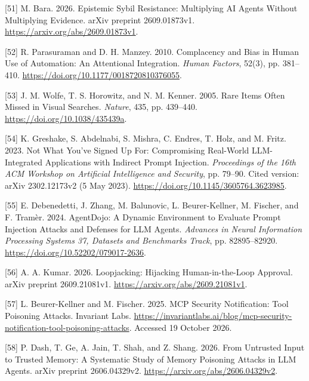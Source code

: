 \documentclass[
  11pt,
]{article}
\newlength{\cslhangindent}
\newlength{\cslentryspacingunit} %
\newenvironment{CSLReferences}[2] %
 {%
  \setlength{\parindent}{0pt}
  \ifodd #1
  \let\oldpar\par
  \def\par{\hangindent=\cslhangindent\oldpar}
  \fi
  \setlength{\parskip}{#2\cslentryspacingunit}
 }%
 {}
\begin{document}
\begin{CSLReferences}{1}{1}
\leavevmode{}%
{[}51{]} M. Bara. 2026. Epistemic Sybil Resistance: Multiplying AI
Agents Without Multiplying Evidence. arXiv preprint 2609.01873v1.
\url{https://arxiv.org/abs/2609.01873v1}.

\leavevmode{}%
{[}52{]} R. Parasuraman and D. H. Manzey. 2010. Complacency and Bias in
Human Use of Automation: An Attentional Integration. \emph{Human
Factors}, 52(3), pp. 381--410.
\url{https://doi.org/10.1177/0018720810376055}.

\leavevmode{}%
{[}53{]} J. M. Wolfe, T. S. Horowitz, and N. M. Kenner. 2005. Rare Items
Often Missed in Visual Searches. \emph{Nature}, 435, pp. 439--440.
\url{https://doi.org/10.1038/435439a}.

\leavevmode{}%
{[}54{]} K. Greshake, S. Abdelnabi, S. Mishra, C. Endres, T. Holz, and
M. Fritz. 2023. Not What You've Signed Up For: Compromising Real-World
LLM-Integrated Applications with Indirect Prompt Injection.
\emph{Proceedings of the 16th ACM Workshop on Artificial Intelligence
and Security}, pp. 79--90. Cited version: arXiv 2302.12173v2 (5 May
2023). \url{https://doi.org/10.1145/3605764.3623985}.

\leavevmode{}%
{[}55{]} E. Debenedetti, J. Zhang, M. Balunovic, L. Beurer-Kellner, M.
Fischer, and F. Tramèr. 2024. AgentDojo: A Dynamic Environment to
Evaluate Prompt Injection Attacks and Defenses for LLM Agents.
\emph{Advances in Neural Information Processing Systems 37, Datasets and
Benchmarks Track}, pp. 82895--82920.
\url{https://doi.org/10.52202/079017-2636}.

\leavevmode{}%
{[}56{]} A. A. Kumar. 2026. Loopjacking: Hijacking Human-in-the-Loop
Approval. arXiv preprint 2609.21081v1.
\url{https://arxiv.org/abs/2609.21081v1}.

\leavevmode{}%
{[}57{]} L. Beurer-Kellner and M. Fischer. 2025. MCP Security
Notification: Tool Poisoning Attacks. Invariant Labs.
\url{https://invariantlabs.ai/blog/mcp-security-notification-tool-poisoning-attacks}.
Accessed 19 October 2026.

\leavevmode{}%
{[}58{]} P. Dash, T. Ge, A. Jain, T. Shah, and Z. Shang. 2026. From
Untrusted Input to Trusted Memory: A Systematic Study of Memory
Poisoning Attacks in LLM Agents. arXiv preprint 2606.04329v2.
\url{https://arxiv.org/abs/2606.04329v2}.


\end{CSLReferences}
\end{document}
